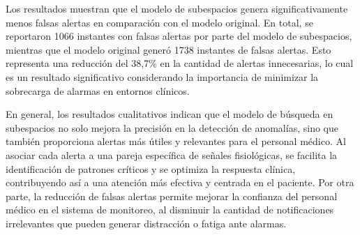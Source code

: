 Los resultados muestran que el modelo de subespacios genera significativamente menos falsas alertas en comparación con el modelo original. En total, se reportaron 1066 instantes con falsas alertas por parte del modelo de subespacios, mientras que el modelo original generó 1738 instantes de falsas alertas. Esto representa una reducción del 38,7\% en la cantidad de alertas innecesarias, lo cual es un resultado significativo considerando la importancia de minimizar la sobrecarga de alarmas en entornos clínicos.

En general, los resultados cualitativos indican que el modelo de búsqueda en subespacios no solo mejora la precisión en la detección de anomalías, sino que también proporciona alertas más útiles y relevantes para el personal médico. Al asociar cada alerta a una pareja específica de señales fisiológicas, se facilita la identificación de patrones críticos y se optimiza la respuesta clínica, contribuyendo así a una atención más efectiva y centrada en el paciente. Por otra parte, la reducción de falsas alertas permite mejorar la confianza del personal médico en el sistema de monitoreo, al disminuir la cantidad de notificaciones irrelevantes que pueden generar distracción o fatiga ante alarmas.